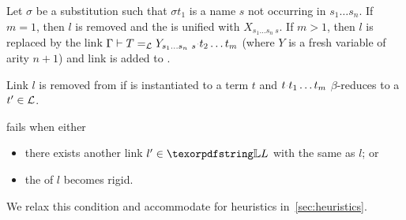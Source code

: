 \begin{definition}[\progBetaLL] \label{def:progBetaLL}
  Let $\sigma$ be a substitution such that $\sigma t_1$ is a name $s$
  not occurring in $s_1\dots s_n$. If $m = 1$, then $l$ is removed and
  the \lhs is
  unified with $X_{s_1\ldots s_n~s}$.
  If $m > 1$, then $l$ is replaced by the link
  $\linkbetaM{\Gamma}{T}{Y_{s_1\dots s_n~s}\appsep t_2\dots t_m}$
  (where $Y$ is a fresh variable of arity $n+1$) and link
  is added to \linkStore.   
\end{definition}

\begin{definition}[\progBetaRH] \label{def:progBetaRH}
  Link $l$ is removed from
  \linkStore if \rhsBetaHead is instantiated to a term $t$ and
  $t \appsep t_1 \ldots t_m$ $\beta$-reduces to a $t' \in \mathcal{L}$.
\end{definition}

\begin{definition}[\progBetaFail] \label{def:progBetaFail}
  \progress fails when either
  \begin{itemize}
  \item
  there exists another link $l' \in \linkStore$ with the same \lhs as $l$; or
  \item the \lhs of $l$
  becomes rigid.
  \end{itemize}
\end{definition}
\noindent
We relax this condition and accommodate for
heuristics in~\cref{sec:heuristics}.

